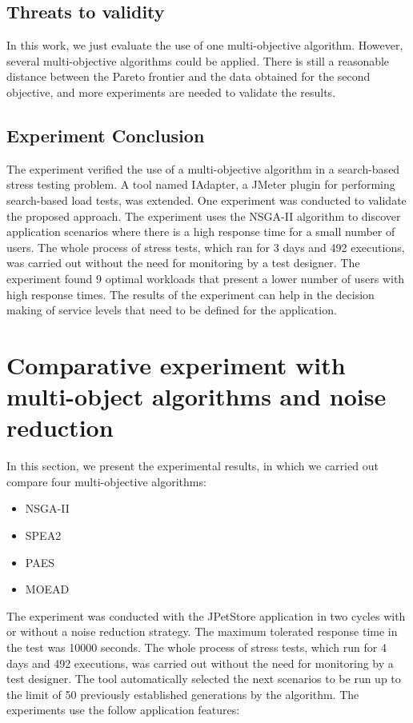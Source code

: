 \documentclass{report}
\begin{document}
\subsection{Threats to validity}

In this work, we just evaluate the use of one multi-objective algorithm. However, several multi-objective algorithms could be applied.  There is still a reasonable distance between the Pareto frontier and the data obtained for the second objective, and more experiments are needed to validate the results.

\subsection{Experiment Conclusion}


The experiment verified the use of a multi-objective algorithm in a search-based stress testing problem. A tool named IAdapter, a JMeter plugin for performing search-based load tests, was extended.  One experiment was conducted to validate the proposed approach. The experiment uses the NSGA-II algorithm to discover application scenarios where there is a high response time for a small number of users. The whole process of stress  tests, which ran for 3 days and 492 executions, was carried out without the need for monitoring by a test designer.  The experiment found 9 optimal workloads that present a lower number of users with high response times. The results of the experiment can help in the decision making of service levels that need to be defined for the application. 

\section{Comparative experiment with multi-object algorithms and noise reduction}


In this section,  we present the experimental results,  in which we carried out compare four multi-objective algorithms:

\begin{itemize}
\item NSGA-II
\item SPEA2
\item PAES
\item MOEAD
\end{itemize}

The experiment was conducted with the JPetStore application in two cycles with or without a noise reduction strategy. The maximum tolerated response time in the test was 10000 seconds.  The whole process of stress  tests, which run for 4 days and 492 executions, was carried out without the need for monitoring by a test designer. The tool automatically selected the next scenarios to be run up to the limit of 50 previously established  generations by the algorithm. The experiments use the follow application features:
\end{document}
